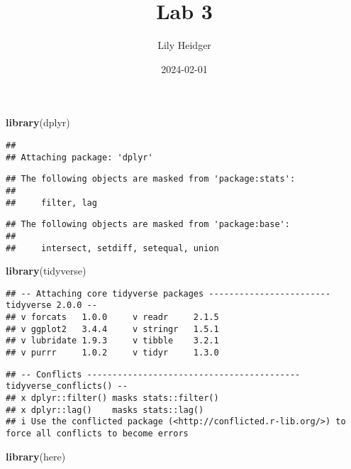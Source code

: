 \documentclass[
]{article}
\title{Lab 3}
\author{Lily Heidger}
\date{2024-02-01}
\newenvironment{Shaded}{\begin{snugshade}}{\end{snugshade}}
\newcommand{\FunctionTok}[1]{\textcolor[rgb]{0.13,0.29,0.53}{\textbf{#1}}}
\newcommand{\NormalTok}[1]{#1}
\begin{document}
\maketitle

\begin{Shaded}
\begin{Highlighting}[]
\FunctionTok{library}\NormalTok{(dplyr)}
\end{Highlighting}
\end{Shaded}

\begin{verbatim}
## 
## Attaching package: 'dplyr'
\end{verbatim}

\begin{verbatim}
## The following objects are masked from 'package:stats':
## 
##     filter, lag
\end{verbatim}

\begin{verbatim}
## The following objects are masked from 'package:base':
## 
##     intersect, setdiff, setequal, union
\end{verbatim}

\begin{Shaded}
\begin{Highlighting}[]
\FunctionTok{library}\NormalTok{(tidyverse)}
\end{Highlighting}
\end{Shaded}

\begin{verbatim}
## -- Attaching core tidyverse packages ------------------------ tidyverse 2.0.0 --
## v forcats   1.0.0     v readr     2.1.5
## v ggplot2   3.4.4     v stringr   1.5.1
## v lubridate 1.9.3     v tibble    3.2.1
## v purrr     1.0.2     v tidyr     1.3.0
\end{verbatim}

\begin{verbatim}
## -- Conflicts ------------------------------------------ tidyverse_conflicts() --
## x dplyr::filter() masks stats::filter()
## x dplyr::lag()    masks stats::lag()
## i Use the conflicted package (<http://conflicted.r-lib.org/>) to force all conflicts to become errors
\end{verbatim}

\begin{Shaded}
\begin{Highlighting}[]
\FunctionTok{library}\NormalTok{(here)}
\end{Highlighting}
\end{Shaded}
\end{document}
